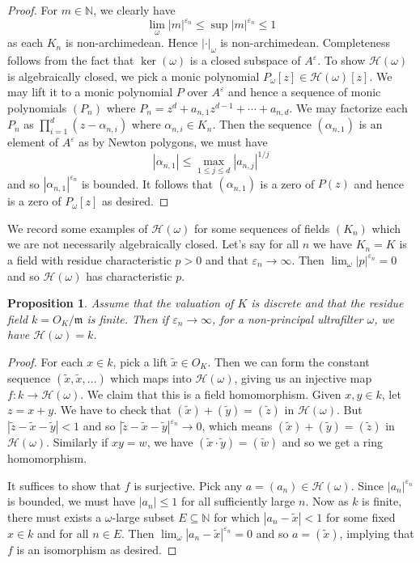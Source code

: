 \documentclass[10pt]{amsart}
\newcommand{\bb}{\mathbb}
\newcommand{\fra}{\mathfrak}
\newcommand{\cal}{\mathcal}
\newcommand{\eps}{\varepsilon}
\numberwithin{theorem}{section}
\newtheorem{proposition}[theorem]{Proposition}
\numberwithin{example}{section}
\numberwithin{definition}{section}
\begin{document}
\begin{proof}
For $m \in \bb{N}$, we clearly have 
$$\lim_{\omega} |m|^{\eps_n} \leq \sup |m|^{\eps_n} \leq 1$$
as each $K_n$ is non-archimedean. Hence $| \cdot |_{\omega}$ is non-archimedean. Completeness follows from the fact that $\ker(\omega)$ is a closed subspace of $A^{\eps}$. To show $\cal{H}(\omega)$ is algebraically closed, we pick a monic polynomial $P_{\omega}[z] \in \cal{H}(\omega)[z]$. We may lift it to a monic polynomial $P$ over $A^{\eps}$ and hence a sequence of monic polynomials $(P_n)$ where $P_n = z^d + a_{n,1} z^{d-1} + \cdots + a_{n,d}$. We may factorize each $P_n$ as $\prod_{i=1}^{d} (z - \alpha_{n,i})$ where $\alpha_{n,i} \in K_n$. Then the sequence $(\alpha_{n,1})$ is an element of $A^{\eps}$ as by Newton polygons, we must have  
$$|\alpha_{n,1}| \leq \max_{1 \leq j \leq d} |a_{n,j}|^{1/j}$$
and so $|\alpha_{n,1}|^{\eps_n}$ is bounded. It follows that $(\alpha_{n,1})$ is a zero of $P(z)$ and hence is a zero of $P_{\omega}[z]$ as desired.
\end{proof}

We record some examples of $\cal{H}(\omega)$ for some sequences of fields $(K_n)$ which we are not necessarily algebraically closed. Let's say for all $n$ we have $K_n = K$ is a  field with residue characteristic $p > 0$ and that $\eps_n \to \infty$. Then $\displaystyle \lim_{\omega} |p|^{\eps_n} = 0$ and so $\cal{H}(\omega)$ has characteristic $p$.

\begin{proposition} \label{Example1}
Assume that the valuation of $K$ is discrete and that the residue field $k = O_K/\fra{m}$ is finite. Then if $\eps_n \to \infty$, for a non-principal ultrafilter $\omega$, we have $\cal{H}(\omega) = k$.
\end{proposition}

\begin{proof}
For each $x \in k$, pick a lift $\tilde{x} \in O_K$. Then we can form the constant sequence $(\tilde{x}, \tilde{x},\ldots)$ which maps into $\cal{H}(\omega)$, giving us an injective map $f: k \to \cal{H}(\omega)$. We claim that this is a field homomorphism. Given $x,y \in k$, let $z = x+y$. We have to check that $(\tilde{x}) + (\tilde{y}) = (\tilde{z})$ in $\cal{H}(\omega)$. But $|\tilde{z} - \tilde{x} - \tilde{y}| < 1$ and so $|\tilde{z} - \tilde{x} 
- \tilde{y}|^{\eps_n} \to 0$, which means $(\tilde{x}) + (\tilde{y}) = (\tilde{z})$ in $\cal{H}(\omega)$. Similarly if $xy = w$, we have $(\tilde{x} \cdot \tilde{y}) = (\tilde{w})$ and so we get a ring homomorphism. 
\par 
It suffices to show that $f$ is surjective. Pick any $a = (a_n) \in \cal{H}(\omega)$. Since $|a_n|^{\eps_n}$ is bounded, we must have $|a_n| \leq 1$ for all sufficiently large $n$. Now as $k$ is finite, there must exists a $\omega$-large subset $E \subseteq \bb{N}$ for which $|a_n - \tilde{x}| < 1$ for some fixed $x \in k$ and for all $n \in E$. Then $\lim_{\omega} |a_n - \tilde{x}|^{\eps_n} = 0$ and so $a = (\tilde{x})$, implying that $f$ is an isomorphism as desired. 
\end{proof}
\end{document}
